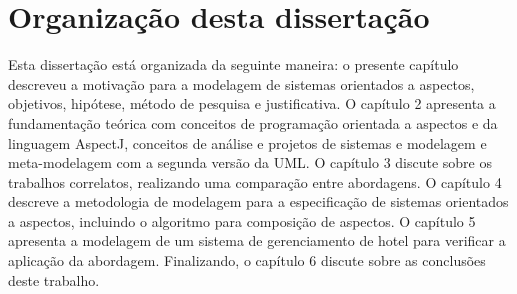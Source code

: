 \section{Organização desta dissertação}

Esta dissertação está organizada da seguinte maneira: o presente capítulo descreveu a motivação para a modelagem de sistemas orientados a aspectos,
objetivos, hipótese, método de pesquisa e justificativa. O capítulo {2} apresenta a fundamentação teórica com conceitos de programação orientada a
aspectos e da linguagem AspectJ, conceitos de análise e projetos de sistemas e modelagem e meta-modelagem com a segunda versão da UML. O capítulo {3} 
discute sobre os trabalhos correlatos, realizando uma comparação entre abordagens. O capítulo {4} descreve a metodologia de modelagem
para a especificação de sistemas orientados a aspectos, incluindo o algoritmo para composição de aspectos. O capítulo {5} apresenta a modelagem de um
sistema de gerenciamento de hotel para verificar a aplicação da abordagem. Finalizando, o capítulo {6} discute sobre as conclusões deste trabalho.

